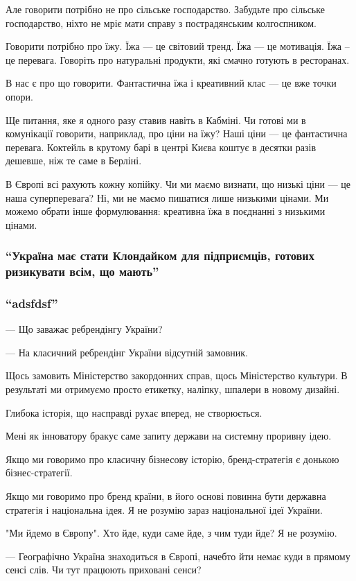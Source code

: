 Але говорити потрібно не про сільське господарство. Забудьте про сільське
господарство, ніхто не мріє мати справу з пострадянським колгоспником. 

Говорити потрібно про їжу. Їжа --- це світовий тренд. Їжа --- це мотивація. Їжа –
це перевага. Говоріть про натуральні продукти, які смачно готують в ресторанах. 

В нас є про що говорити. Фантастична їжа і креативний клас --- це вже точки
опори.

Ще питання, яке я одного разу ставив навіть в Кабміні. Чи готові ми в
комунікації говорити, наприклад, про ціни на їжу? Наші ціни --- це фантастична
перевага. Коктейль в крутому барі в центрі Києва коштує в десятки разів
дешевше, ніж те саме в Берліні.

В Європі всі рахують кожну копійку. Чи ми маємо визнати, що низькі ціни --- це
наша суперперевага? Ні, ми не маємо пишатися лише низькими цінами. Ми можемо
обрати інше формулювання: креативна їжа в поєднанні з низькими цінами.

\subsubsection{\enquote{Україна має стати Клондайком для підприємців, готових ризикувати всім, що мають}}
\subsubsection{\enquote{adsfdsf}}

--- Що заважає ребрендінгу України?

--- На класичний ребрендінг України відсутній замовник.

Щось замовить Міністерство закордонних справ, щось Міністерство культури. В
результаті ми отримуємо просто етикетку, наліпку, шпалери в новому дизайні.

Глибока історія, що насправді рухає вперед, не створюється.

Мені як інноватору бракує саме запиту держави на системну проривну ідею.

Якщо ми говоримо про класичну бізнесову історію, бренд-стратегія є донькою
бізнес-стратегії. 

Якщо ми говоримо про бренд країни, в його основі повинна бути державна
стратегія і національна ідея. Я не розумію зараз національної ідеї України.

"Ми йдемо в Європу". Хто йде, куди саме йде, з чим туди йде? Я не розумію.

--- Географічно Україна знаходиться в Європі, начебто йти немає куди в прямому
сенсі слів. Чи тут працюють приховані сенси?

